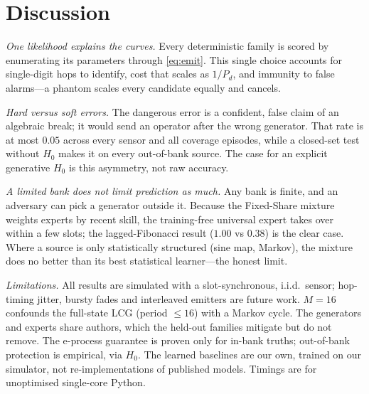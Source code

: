 \documentclass[conference]{IEEEtran}
\begin{document}
\section{Discussion}
\label{sec:discussion}
\emph{One likelihood explains the curves.} Every deterministic family is scored
by enumerating its parameters through \eqref{eq:emit}. This single choice
accounts for single-digit hops to identify, cost that scales as $1/P_d$, and
immunity to false alarms---a phantom scales every candidate equally and cancels.

\emph{Hard versus soft errors.} The dangerous error is a confident, false claim
of an algebraic break; it would send an operator after the wrong generator. That
rate is at most $0.05$ across every sensor and all coverage episodes, while a
closed-set test without $H_0$ makes it on every out-of-bank source. The case for
an explicit generative $H_0$ is this asymmetry, not raw accuracy.

\emph{A limited bank does not limit prediction as much.} Any bank is finite, and
an adversary can pick a generator outside it. Because the Fixed-Share mixture
weights experts by recent skill, the training-free universal expert takes over
within a few slots; the lagged-Fibonacci result ($1.00$ vs $0.38$) is the clear
case. Where a source is only statistically structured (sine map, Markov), the
mixture does no better than its best statistical learner---the honest limit.

\emph{Limitations.} All results are simulated with a slot-synchronous, i.i.d.\
sensor; hop-timing jitter, bursty fades and interleaved emitters are future
work. $M=16$ confounds the full-state LCG (period $\leq 16$) with a Markov
cycle. The generators and experts share authors, which the held-out families
mitigate but do not remove. The e-process guarantee is proven only for in-bank
truths; out-of-bank protection is empirical, via $H_0$. The learned baselines
are our own, trained on our simulator, not re-implementations of published
models. Timings are for unoptimised single-core Python.

\end{document}
